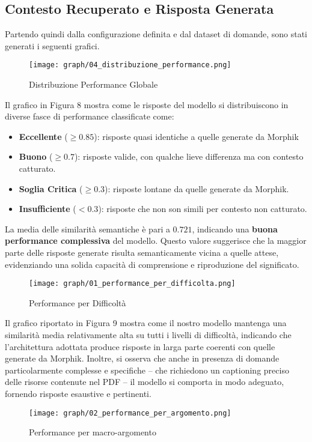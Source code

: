 \subsection{Contesto Recuperato e Risposta Generata}
Partendo quindi dalla configurazione definita e dal dataset di domande, sono stati generati i seguenti grafici.
\begin{figure}[H]
\centering
\texttt{[image: graph/04\_distribuzione\_performance.png]}
\caption{Distribuzione Performance Globale}
\end{figure}
Il grafico in Figura 8 mostra come le risposte del modello si distribuiscono in diverse fasce di performance classificate come:
\begin{itemize}
    \item \textbf{Eccellente} (\(\geq0.85\)): risposte quasi identiche a quelle generate da Morphik
    \item \textbf{Buono} (\(\geq0.7\)): risposte valide, con qualche lieve differenza ma con contesto catturato.
    \item \textbf{Soglia Critica} (\(\geq0.3\)): risposte lontane da quelle generate da Morphik.
    \item \textbf{Insufficiente} (\(<0.3\)): risposte che non son simili per contesto non catturato.
\end{itemize}
La media delle similarità semantiche è pari a $0.721$, indicando una \textbf{buona performance complessiva} del modello. Questo valore suggerisce che la maggior parte delle risposte generate risulta semanticamente vicina a quelle attese, evidenziando una solida capacità di comprensione e riproduzione del significato.

\begin{figure}[H]
\centering
\texttt{[image: graph/01\_performance\_per\_difficolta.png]}
\caption{Performance per Difficoltà}
\end{figure}

Il grafico riportato in Figura 9 mostra come il nostro modello mantenga una similarità media relativamente alta su tutti i livelli di difficoltà, indicando che l’architettura adottata produce risposte in larga parte coerenti con quelle generate da Morphik. Inoltre, si osserva che anche in presenza di domande particolarmente complesse e specifiche – che richiedono un captioning preciso delle risorse contenute nel PDF – il modello si comporta in modo adeguato, fornendo risposte esaustive e pertinenti.

\begin{figure}[H]
\centering
\texttt{[image: graph/02\_performance\_per\_argomento.png]}
\caption{Performance per macro-argomento}
\end{figure}


